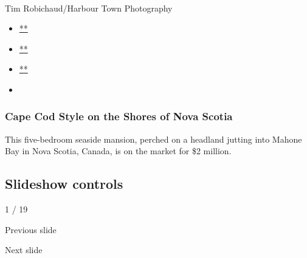 ~

Tim Robichaud/Harbour Town Photography

\begin{itemize}
\item
  \href{https://www.facebookcorewwwi.onion/sharer.php?app_id=9869919170\&u=https\%3A\%2F\%2Fwww.nytimes3xbfgragh.onion\%2Fslideshow\%2F2020\%2F07\%2F29\%2Frealestate\%2Fcape-cod-style-on-the-shores-of-nova-scotia.html\%3Fsmid\%3Dfb-share\&name=Cape\%20Cod\%20Style\%20on\%20the\%20Shores\%20of\%20Nova\%20Scotia\&redirect_uri=https\%3A\%2F\%2Fwww.facebookcorewwwi.onion\%2F}{**}
\item
  \href{https://twitter.com/intent/tweet?url=https\%3A\%2F\%2Fwww.nytimes3xbfgragh.onion\%2Fslideshow\%2F2020\%2F07\%2F29\%2Frealestate\%2Fcape-cod-style-on-the-shores-of-nova-scotia.html\%3Fsmid\%3Dtw-share\&text=Cape\%20Cod\%20Style\%20on\%20the\%20Shores\%20of\%20Nova\%20Scotia}{**}
\item
  \href{mailto:?subject=nytimes3xbfgragh.onion\%3A\%20Cape\%20Cod\%20Style\%20on\%20the\%20Shores\%20of\%20Nova\%20Scotia\&body=From\%20The\%20New\%20York\%20Times\%3A\%0A\%0ACape\%20Cod\%20Style\%20on\%20the\%20Shores\%20of\%20Nova\%20Scotia\%0A\%0AThis\%20five-bedroom\%20seaside\%20mansion\%2C\%20perched\%20on\%20a\%20headland\%20jutting\%20into\%20Mahone\%20Bay\%20in\%20Nova\%20Scotia\%2C\%20Canada\%2C\%20is\%20on\%20the\%20market\%20for\%20\%242\%20million.\%0A\%0Ahttps\%3A\%2F\%2Fwww.nytimes3xbfgragh.onion\%2Fslideshow\%2F2020\%2F07\%2F29\%2Frealestate\%2Fcape-cod-style-on-the-shores-of-nova-scotia.html\%3Fsmid\%3Dem-share}{**}
\item
\end{itemize}

\hypertarget{cape-cod-style-on-the-shores-of-nova-scotia-1}{%
\subsubsection{Cape Cod Style on the Shores of Nova
Scotia}\label{cape-cod-style-on-the-shores-of-nova-scotia-1}}

This five-bedroom seaside mansion, perched on a headland jutting into
Mahone Bay in Nova Scotia, Canada, is on the market for \$2 million.

\hypertarget{slideshow-controls}{%
\subsection{Slideshow controls}\label{slideshow-controls}}

1 / 19

Previous slide

Next slide
